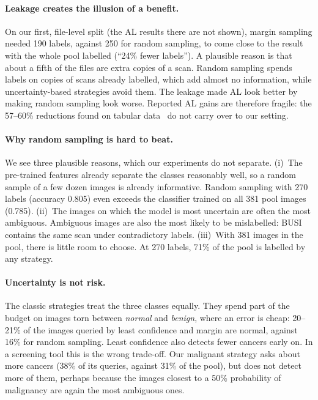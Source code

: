 \documentclass{article}
\begin{document}
\paragraph{Leakage creates the illusion of a benefit.}
On our first, file-level split (the AL results there are not shown), margin sampling needed 190 labels, against 250 for random
sampling, to come close to the result with the whole pool labelled (``24\% fewer labels'').
A plausible reason is that about a fifth of the files are extra copies of a scan. Random
sampling spends labels on copies of scans already labelled, which add almost no
information, while uncertainty-based strategies avoid them. The leakage made AL look better
by making random sampling look worse. Reported AL gains are therefore fragile: the
57--60\% reductions found on tabular data~\cite{faria2022joint} do not carry over to our
setting.

\paragraph{Why random sampling is hard to beat.}
We see three plausible reasons, which our experiments do not separate. (i)~The pre-trained
features already separate the classes reasonably well, so a random sample of a few dozen
images is already informative. Random sampling with 270 labels (accuracy 0.805) even
exceeds the classifier trained on all 381 pool images (0.785). (ii)~The images on which the
model is most uncertain are often the most ambiguous. Ambiguous images are also the most
likely to be mislabelled: BUSI contains the same scan under contradictory labels.
(iii)~With 381 images in the pool, there is little room to choose. At 270 labels, 71\% of
the pool is labelled by any strategy.

\paragraph{Uncertainty is not risk.}
The classic strategies treat the three classes equally. They spend part of the budget on
images torn between \emph{normal} and \emph{benign}, where an error is cheap: 20--21\% of
the images queried by least confidence and margin are normal, against 16\% for random
sampling. Least confidence also detects fewer cancers early on. In a screening tool this is the wrong trade-off.
Our malignant strategy asks about more cancers (38\% of its queries, against 31\% of the pool), but
does not detect more of them, perhaps
because the images closest to a 50\% probability of malignancy are again the most ambiguous
ones.
\end{document}
